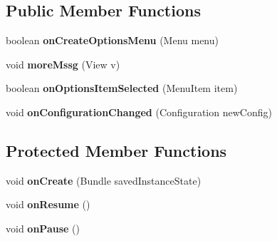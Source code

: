 \subsection*{Public Member Functions}
\begin{DoxyCompactItemize}
\item 
boolean {\bfseries on\+Create\+Options\+Menu} (Menu menu)\hypertarget{classcom_1_1example_1_1sebastian_1_1tindertp_1_1ChatActivity_a28413a5ac10b9af91de6a1bfe9d5d652}{}\label{classcom_1_1example_1_1sebastian_1_1tindertp_1_1ChatActivity_a28413a5ac10b9af91de6a1bfe9d5d652}

\item 
void {\bfseries more\+Mssg} (View v)\hypertarget{classcom_1_1example_1_1sebastian_1_1tindertp_1_1ChatActivity_adb227b63a3c097fdf7354588cb8c03e2}{}\label{classcom_1_1example_1_1sebastian_1_1tindertp_1_1ChatActivity_adb227b63a3c097fdf7354588cb8c03e2}

\item 
boolean {\bfseries on\+Options\+Item\+Selected} (Menu\+Item item)\hypertarget{classcom_1_1example_1_1sebastian_1_1tindertp_1_1ChatActivity_a2689263b792cb49265f8a3c1a11d84da}{}\label{classcom_1_1example_1_1sebastian_1_1tindertp_1_1ChatActivity_a2689263b792cb49265f8a3c1a11d84da}

\item 
void {\bfseries on\+Configuration\+Changed} (Configuration new\+Config)\hypertarget{classcom_1_1example_1_1sebastian_1_1tindertp_1_1ChatActivity_ae2d795da0a45be6092d0bdc4e240852e}{}\label{classcom_1_1example_1_1sebastian_1_1tindertp_1_1ChatActivity_ae2d795da0a45be6092d0bdc4e240852e}

\end{DoxyCompactItemize}
\subsection*{Protected Member Functions}
\begin{DoxyCompactItemize}
\item 
void {\bfseries on\+Create} (Bundle saved\+Instance\+State)\hypertarget{classcom_1_1example_1_1sebastian_1_1tindertp_1_1ChatActivity_a581b327883f080b7d7c6c381d70e3197}{}\label{classcom_1_1example_1_1sebastian_1_1tindertp_1_1ChatActivity_a581b327883f080b7d7c6c381d70e3197}

\item 
void {\bfseries on\+Resume} ()\hypertarget{classcom_1_1example_1_1sebastian_1_1tindertp_1_1ChatActivity_aab16e5c582f2995d99985ea4210e2148}{}\label{classcom_1_1example_1_1sebastian_1_1tindertp_1_1ChatActivity_aab16e5c582f2995d99985ea4210e2148}

\item 
void {\bfseries on\+Pause} ()\hypertarget{classcom_1_1example_1_1sebastian_1_1tindertp_1_1ChatActivity_aff770238d9afab40feb895aa9c3ec6f8}{}\label{classcom_1_1example_1_1sebastian_1_1tindertp_1_1ChatActivity_aff770238d9afab40feb895aa9c3ec6f8}

\end{DoxyCompactItemize}
